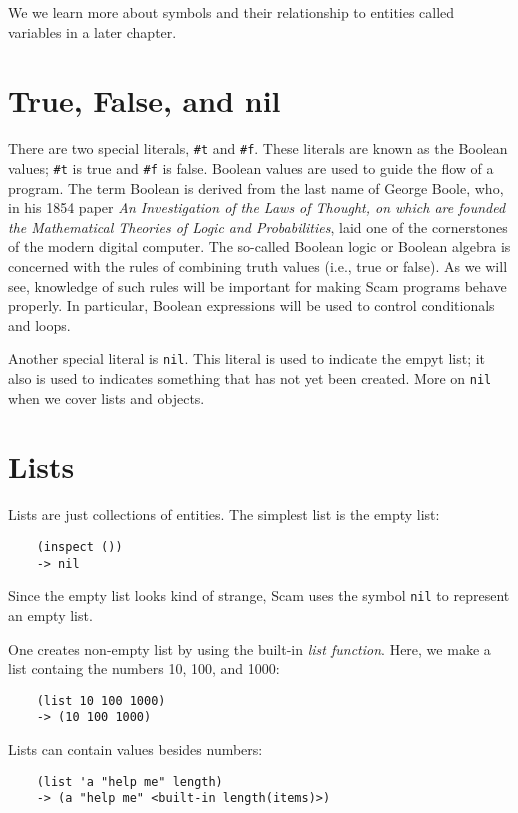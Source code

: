 We we learn more about symbols and their relationship to entities
called variables in a later chapter.

\section{True, False, and nil}

There are two special literals, \verb!#t!
and \verb!#f!.
These literals are known as the {\sc Boolean} values;
\verb!#t! is true and \verb!#f! is false.
Boolean values are used to guide the flow of a program.
The term {\sc Boolean} is derived from the last name of George Boole, who,
in his 1854 paper {\it An Investigation of the Laws of Thought, on which are
founded the Mathematical Theories of Logic and Probabilities}, laid one
of the cornerstones of the modern digital computer. The so-called {\sc Boolean}
logic or {\sc Boolean} algebra is concerned with the rules of combining truth
values (i.e., true or false). As we will see, knowledge of such rules will
be important for making Scam programs behave properly. In particular,
{\sc Boolean} expressions will be used to control conditionals and loops.

Another special literal is \verb!nil!.
This literal is used to
indicate the empyt list; it also is used
to indicates something that has not yet been
created. More on \verb!nil! when we cover lists and
objects.

\section{Lists}

Lists are just collections of entities.
The simplest list is the empty list:

\begin{verbatim}
    (inspect ())
    -> nil
\end{verbatim}

Since the empty list looks kind of strange, Scam uses the symbol \verb!nil!
to represent an empty list.

One creates non-empty list by
using the built-in {\it list function}. 
Here, we make a list containg the numbers
10, 100, and 1000:

\begin{verbatim}
    (list 10 100 1000)
    -> (10 100 1000)
\end{verbatim}

Lists can contain values besides numbers:

\begin{verbatim}
    (list 'a "help me" length)
    -> (a "help me" <built-in length(items)>)
\end{verbatim}

